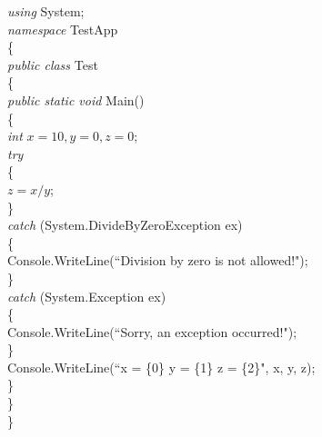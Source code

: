 {\begin{list}{E \thechapter.\theenumi}
\emph{using} System;\\
\emph{namespace} TestApp\\
\{\\
\hspace*{0.2in} \emph{public class} Test\\
\hspace*{0.2in}   \{\\
\hspace*{0.4in}        \emph{public static void} Main()\\
\hspace*{0.4in}        \{\\
\hspace*{0.6in}            \emph{int} $x = 10, y = 0, z = 0$;\\
\hspace*{0.6in}            \emph{try}\\
\hspace*{0.6in}            \{\\
\hspace*{0.8in}                $z = x / y$;\\
\hspace*{0.6in}            \}\\
\hspace*{0.6in}            \emph{catch} (System.DivideByZeroException ex)\\
\hspace*{0.6in}            \{\\
\hspace*{0.8in}                Console.WriteLine(``Division by
zero is not allowed!");\\
\hspace*{0.6in}            \}\\
\hspace*{0.6in}            \emph{catch} (System.Exception ex)\\
\hspace*{0.6in}            \{\\
\hspace*{0.8in}                Console.WriteLine(``Sorry, an
exception occurred!");\\
\hspace*{0.6in}            \}\\
\hspace*{0.6in}            Console.WriteLine(``x = \{0\}  y =
\{1\}  z = \{2\}", x, y, z);\\
\hspace*{0.4in}        \}\\
\hspace*{0.2in}    \}\\
\}



\end{list}}
